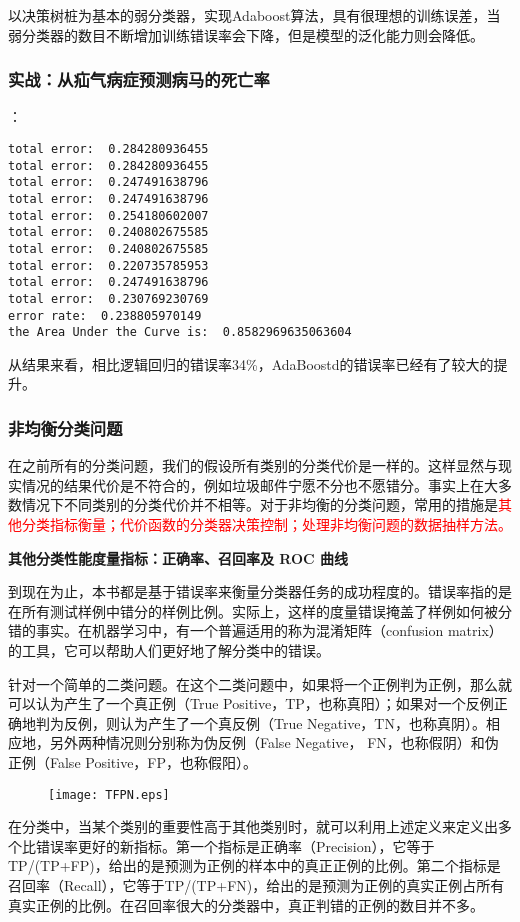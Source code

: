 以决策树桩为基本的弱分类器，实现Adaboost算法，具有很理想的训练误差，当弱分类器的数目不断增加训练错误率会下降，但是模型的泛化能力则会降低。

\subsubsection{实战：从疝气病症预测病马的死亡率}
：
\begin{lstlisting}
total error:  0.284280936455
total error:  0.284280936455
total error:  0.247491638796
total error:  0.247491638796
total error:  0.254180602007
total error:  0.240802675585
total error:  0.240802675585
total error:  0.220735785953
total error:  0.247491638796
total error:  0.230769230769
error rate:  0.238805970149
the Area Under the Curve is:  0.8582969635063604
\end{lstlisting}

从结果来看，相比逻辑回归的错误率34\%，AdaBoostd的错误率已经有了较大的提升。


\subsubsection{非均衡分类问题}
在之前所有的分类问题，我们的假设所有类别的分类代价是一样的。这样显然与现实情况的结果代价是不符合的，例如垃圾邮件宁愿不分也不愿错分。事实上在大多数情况下不同类别的分类代价并不相等。对于非均衡的分类问题，常用的措施是\textcolor{red}{其他分类指标衡量；代价函数的分类器决策控制；处理非均衡问题的数据抽样方法。}

\textbf{其他分类性能度量指标：正确率、召回率及 ROC 曲线 }

到现在为止，本书都是基于错误率来衡量分类器任务的成功程度的。错误率指的是在所有测试样例中错分的样例比例。实际上，这样的度量错误掩盖了样例如何被分错的事实。在机器学习中，有一个普遍适用的称为混淆矩阵（confusion matrix）的工具，它可以帮助人们更好地了解分类中的错误。

针对一个简单的二类问题。在这个二类问题中，如果将一个正例判为正例，那么就可以认为产生了一个真正例（True Positive，TP，也称真阳）；如果对一个反例正确地判为反例，则认为产生了一个真反例（True Negative，TN，也称真阴）。相应地，另外两种情况则分别称为伪反例（False Negative， FN，也称假阴）和伪正例（False Positive，FP，也称假阳）。

\begin{figure}[!h]
  \centering
  \texttt{[image: TFPN.eps]}
\end{figure}


在分类中，当某个类别的重要性高于其他类别时，就可以利用上述定义来定义出多个比错误率更好的新指标。第一个指标是正确率（Precision），它等于TP/(TP+FP)，给出的是预测为正例的样本中的真正正例的比例。第二个指标是召回率（Recall），它等于TP/(TP+FN)，给出的是预测为正例的真实正例占所有真实正例的比例。在召回率很大的分类器中，真正判错的正例的数目并不多。

